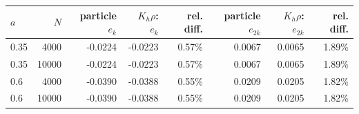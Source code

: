 \begin{tabular}{lrrrrrrr}
\toprule
$a$ & $N$ & particle $e_k$ & $K_h\rho$: $e_k$ & rel. diff. & particle $e_{2k}$ & $K_h\rho$: $e_{2k}$ & rel. diff.  \\
\midrule
0.35 & 4000 & -0.0224 & -0.0223 & 0.57\% & 0.0067 & 0.0065 & 1.89\% \\
0.35 & 10000 & -0.0224 & -0.0223 & 0.57\% & 0.0067 & 0.0065 & 1.89\% \\
0.6 & 4000 & -0.0390 & -0.0388 & 0.55\% & 0.0209 & 0.0205 & 1.82\% \\
0.6 & 10000 & -0.0390 & -0.0388 & 0.55\% & 0.0209 & 0.0205 & 1.82\% \\
\bottomrule
\end{tabular}
